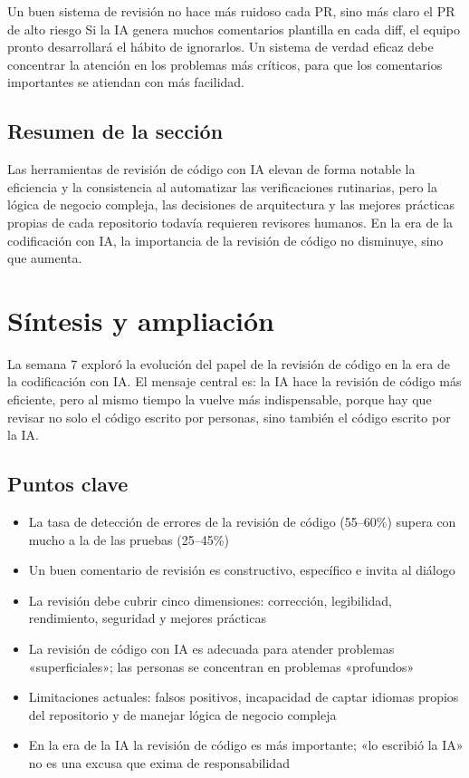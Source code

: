 \documentclass[a4paper]{article}
\begin{document}
\begin{knowledgebox}{Un buen sistema de revisión no hace más ruidoso cada PR, sino más claro el PR de alto riesgo}
Si la IA genera muchos comentarios plantilla en cada diff, el equipo pronto desarrollará el hábito de ignorarlos. Un sistema de verdad eficaz debe concentrar la atención en los problemas más críticos, para que los comentarios importantes se atiendan con más facilidad.
\end{knowledgebox}

\subsection{Resumen de la sección}

Las herramientas de revisión de código con IA elevan de forma notable la eficiencia y la consistencia al automatizar las verificaciones rutinarias, pero la lógica de negocio compleja, las decisiones de arquitectura y las mejores prácticas propias de cada repositorio todavía requieren revisores humanos. En la era de la codificación con IA, la importancia de la revisión de código no disminuye, sino que aumenta.
\section{Síntesis y ampliación}

La semana 7 exploró la evolución del papel de la revisión de código en la era de la codificación con IA. El mensaje central es: la IA hace la revisión de código más eficiente, pero al mismo tiempo la vuelve más indispensable, porque hay que revisar no solo el código escrito por personas, sino también el código escrito por la IA.

\subsection{Puntos clave}

\begin{itemize}
    \item La tasa de detección de errores de la revisión de código (55--60\%) supera con mucho a la de las pruebas (25--45\%)
    \item Un buen comentario de revisión es constructivo, específico e invita al diálogo
    \item La revisión debe cubrir cinco dimensiones: corrección, legibilidad, rendimiento, seguridad y mejores prácticas
    \item La revisión de código con IA es adecuada para atender problemas «superficiales»; las personas se concentran en problemas «profundos»
    \item Limitaciones actuales: falsos positivos, incapacidad de captar idiomas propios del repositorio y de manejar lógica de negocio compleja
    \item En la era de la IA la revisión de código es más importante; «lo escribió la IA» no es una excusa que exima de responsabilidad
\end{itemize}
\end{document}
